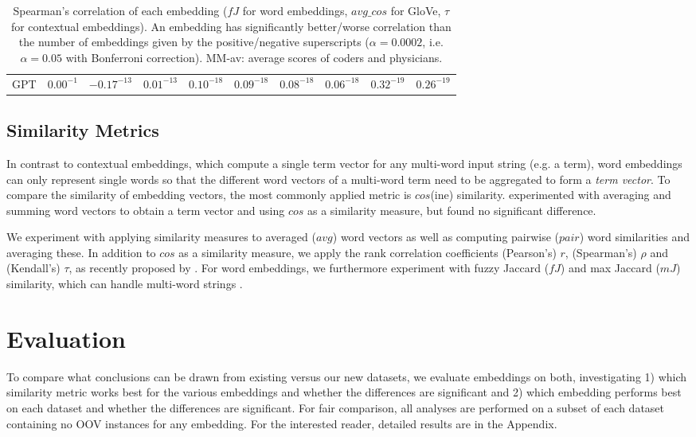 \documentclass[letterpaper]{article} %
\begin{document}
\begin{table*}[th]
\begin{tabular}{l l l l l l l l l l}
GPT & $0.00^{-1}$ & $-0.17^{-13}$ & $0.01^{-13}$ & $0.10^{-18}$ & $0.09^{-18}$ & $0.08^{-18}$ & $0.06^{-18}$ & $0.32^{-19}$ & $0.26^{-19}$ \\
    \end{tabular}
    \caption{Spearman's correlation of each embedding ($fJ$ for word embeddings, $avg\_cos$ for GloVe, $\tau$ for contextual embeddings).
    An embedding has significantly better/worse correlation than the number of embeddings given by the positive/negative superscripts ($\alpha = 0.0002$, i.e. $\alpha = 0.05$ with Bonferroni correction). MM-av: average scores of coders and physicians.}
    \label{tab:significance_existingDatasets}
\end{table*}

\subsection{Similarity Metrics}
In contrast to contextual embeddings, which compute a single term vector for any multi-word input string (e.g. a term), word embeddings can only represent single words so that the different word vectors of a multi-word term need to be aggregated to form a \emph{term vector}. To compare the similarity of embedding vectors, the most commonly applied metric is $cos$(ine) similarity.
\citeauthor{HenryCM2018} 
experimented with averaging and summing word vectors to obtain a term vector and using $cos$ as a similarity measure, but found no significant difference.

We experiment with applying similarity measures to averaged ($avg$) word vectors as well as computing pairwise ($pair$) word similarities and averaging these.
In addition to $cos$ as a similarity measure, we apply the rank correlation coefficients (Pearson's) $r$, (Spearman's) $\rho$ and (Kendall's) $\tau$, as recently proposed by \citeauthor{ZhelezniakEtAl2019-correlation} .
For word embeddings, we furthermore experiment with fuzzy Jaccard ($fJ$)
and max Jaccard ($mJ$) similarity, which can handle multi-word strings \cite{ZhelezniakEtAl2019-fuzzyJaccard}.


\section{Evaluation}
To compare what conclusions can be drawn from existing versus our new datasets, we evaluate embeddings on both, investigating 1) which similarity metric works best for the various embeddings and whether the differences are significant and 2) which embedding performs best on each dataset and whether the differences are significant.
For fair comparison, all analyses are performed on a subset of each dataset containing no OOV instances for any embedding.
For the interested reader, detailed results are in the Appendix.
\end{document}
